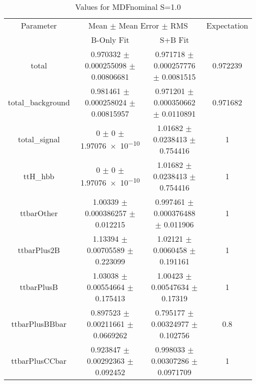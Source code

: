 \begin{table}
\centering
\caption{Values for MDFnominal S=1.0}
\begin{tabular}{cccc}
\toprule
Parameter & \multicolumn{2}{c}{Mean $\pm$ Mean Error $\pm$ RMS} & Expectation\\
 & B-Only Fit & S+B Fit & \\
\midrule
total & \num{0.970332} $\pm$ \num{0.000255098} $\pm$ \num{0.00806681} & \num{0.971718} $\pm$ \num{0.000257776} $\pm$ \num{0.0081515} & \num{0.972239}\\
total\_background & \num{0.981461} $\pm$ \num{0.000258024} $\pm$ \num{0.00815957} & \num{0.971201} $\pm$ \num{0.000350662} $\pm$ \num{0.0110891} & \num{0.971682}\\
total\_signal & \num{0} $\pm$ \num{0} $\pm$ \num{1.97076e-10} & \num{1.01682} $\pm$ \num{0.0238413} $\pm$ \num{0.754416} & \num{1}\\
ttH\_hbb & \num{0} $\pm$ \num{0} $\pm$ \num{1.97076e-10} & \num{1.01682} $\pm$ \num{0.0238413} $\pm$ \num{0.754416} & \num{1}\\
ttbarOther & \num{1.00339} $\pm$ \num{0.000386257} $\pm$ \num{0.012215} & \num{0.997461} $\pm$ \num{0.000376488} $\pm$ \num{0.011906} & \num{1}\\
ttbarPlus2B & \num{1.13394} $\pm$ \num{0.00705589} $\pm$ \num{0.223099} & \num{1.02121} $\pm$ \num{0.0060458} $\pm$ \num{0.191161} & \num{1}\\
ttbarPlusB & \num{1.03038} $\pm$ \num{0.00554664} $\pm$ \num{0.175413} & \num{1.00423} $\pm$ \num{0.00547634} $\pm$ \num{0.17319} & \num{1}\\
ttbarPlusBBbar & \num{0.897523} $\pm$ \num{0.00211661} $\pm$ \num{0.0669262} & \num{0.795177} $\pm$ \num{0.00324977} $\pm$ \num{0.102756} & \num{0.8}\\
ttbarPlusCCbar & \num{0.923847} $\pm$ \num{0.00292363} $\pm$ \num{0.092452} & \num{0.998033} $\pm$ \num{0.00307286} $\pm$ \num{0.0971709} & \num{1}\\
\bottomrule
\end{tabular}
\end{table}